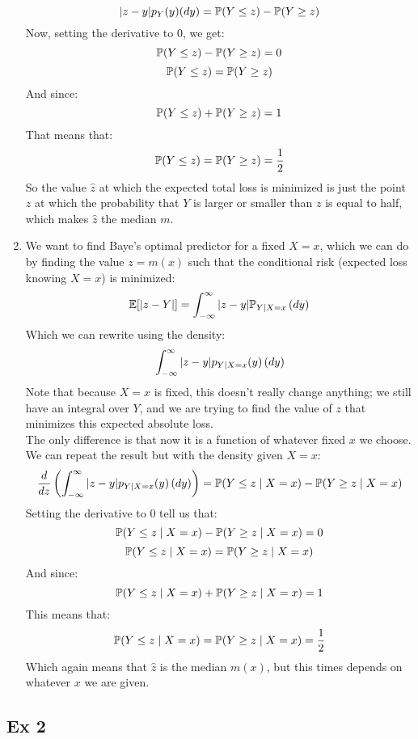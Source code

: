 \documentclass[12pt]{article}
\begin{document}
\begin{enumerate}[label = \alph*)]
\[{{|z - y|p_Y(y)}{(dy)} } = 
\mathbb{P}(Y \leq z) - \mathbb{P}(Y \geq z) \]
Now, setting the derivative to $0$,
we get:
\[ \mathbb{P}(Y \leq z) - \mathbb{P}(Y \geq z) = 0 \]
\[ \mathbb{P}(Y \leq z) = \mathbb{P}(Y \geq z) \]
And since:
\[ \mathbb{P}(Y \leq z) + \mathbb{P}(Y \geq z) = 1 \]
That means that:
\[ \mathbb{P}(Y \leq z) = \mathbb{P}(Y \geq z) = \dfrac{1}{2} \]
So the value $\hat{z}$
at which the expected total loss is minimized
is just the point $z$
at which the probability that $Y$
is larger or smaller than $z$ is equal to half,
which makes $\hat{z}$ the median $m$.
\item
We want to find Baye's optimal predictor
for a fixed $X = x$,
which we can do by finding the value $z = m(x)$
such that the conditional risk 
(expected loss knowing $X = x$) is minimized:
\[ \mathbb{E}[|z - Y|] 
= \int_{-\infty}^{\infty} |z - y|\mathbb{P}_{Y \mid X = x} \, (dy) \]
Which we can rewrite using the density:
\[ \int_{-\infty}^{\infty} |z - y|p_{Y | X = x}(y) \, (dy) \]
Note that because $X = x$ is fixed,
this doesn't really change anything;
we still have an integral over $Y$,
and we are trying to find the value of $z$
that minimizes this expected absolute loss. \\
The only difference is that now it
is a function of whatever fixed $x$
we choose. \\
We can repeat the result but with the
density given $X = x$:
\[ \dfrac{d}{dz}\left( \int_{-\infty}^{\infty} |z - y|p_{Y | X = x}(y) \, (dy)  \right) = 
\mathbb{P}(Y \leq z \mid X = x) - \mathbb{P}(Y \geq z \mid X = x) \]
Setting the derivative to $0$ tell us that:
\[ \mathbb{P}(Y \leq z \mid X = x) 
- \mathbb{P}(Y \geq z \mid X = x) = 0 \]
\[ \mathbb{P}(Y \leq z \mid X = x) 
= \mathbb{P}(Y \geq z \mid X = x) \]
And since:
\[ \mathbb{P}(Y \leq z \mid X = x) 
+ \mathbb{P}(Y \geq z \mid X = x) = 1 \]
This means that:
\[ \mathbb{P}(Y \leq z \mid X = x) 
= \mathbb{P}(Y \geq z \mid X = x) = \dfrac{1}{2} \]
Which again means that $\hat{z}$
is the median $m(x)$, but this times
depends on whatever $x$ we are given. \\
\end{enumerate}

\newpage

\subsection*{Ex 2}
\end{document}
